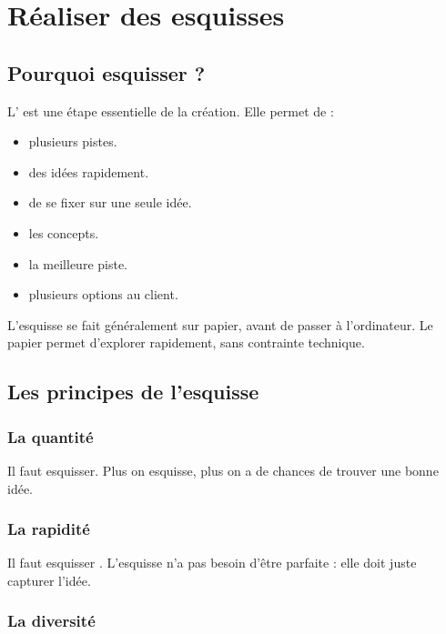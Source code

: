 \section{Réaliser des esquisses}

\subsection{Pourquoi esquisser ?}

L' est une étape essentielle de la création. Elle permet de :

\begin{itemize}
    \item {} plusieurs pistes.
    \item {} des idées rapidement.
    \item {} de se fixer sur une seule idée.
    \item {} les concepts.
    \item {} la meilleure piste.
    \item {} plusieurs options au client.
\end{itemize}

L'esquisse se fait généralement sur papier, avant de passer à l'ordinateur. Le papier permet d'explorer rapidement, sans contrainte technique.

\subsection{Les principes de l'esquisse}

\subsubsection{La quantité}

Il faut  esquisser. Plus on esquisse, plus on a de chances de trouver une bonne idée.

\subsubsection{La rapidité}

Il faut esquisser . L'esquisse n'a pas besoin d'être parfaite : elle doit juste capturer l'idée.

\subsubsection{La diversité}


